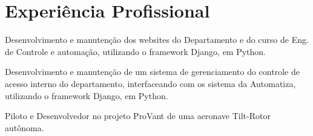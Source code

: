 \documentclass[letterpaper]{deedy-resume} %
\begin{document}
\begin{minipage}[t]{0.66\textwidth} %




\section{Experiência Profissional}

\vspace{\topsep} %
\begin{tightitemize}
 \item Desenvolvimento e manutenção dos websites do Departamento e do curso de Eng. de Controle e automação, utilizando o framework Django, em Python.
\end{tightitemize}

\sectionspace %

\vspace{\topsep} %
\begin{tightitemize}
 \item Desenvolvimento e manutenção de um sistema de gerenciamento do controle de acesso interno do departamento, interfaceando com os sistema da Automatiza, utilizando o framework Django, em Python.
\end{tightitemize}

\sectionspace %


\vspace{\topsep} %
\begin{tightitemize}
 \item Piloto e Desenvolvedor no projeto ProVant de uma aeronave Tilt-Rotor autônoma.
\end{tightitemize}

\sectionspace %


\end{minipage}
\end{document}
